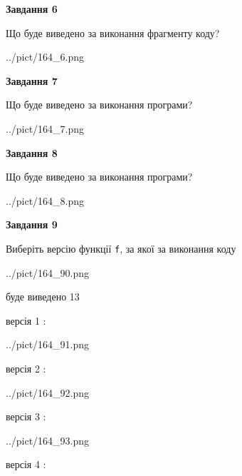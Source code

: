 \documentclass[12pt, ukrainian]{article}
\def\code#1{\Verb!#1!}
\begin{document}
{\begin {large}
{\begin {center}\textbf{Завдання 6}\end {center}}

Що буде виведено за виконання фрагменту коду?\par
\begin{center}
	{../pict/164_6.png}
\end{center}
\newpage

{\begin {center}\textbf{Завдання 7}\end {center}}

Що буде виведено за виконання програми?\par
\begin{center}
	{../pict/164_7.png}
\end{center}
\newpage

{\begin {center}\textbf{Завдання 8}\end {center}}

Що буде виведено за виконання програми?\par
\begin{center}
	{../pict/164_8.png}
\end{center}
\newpage

{\begin {center}\textbf{Завдання 9}\end {center}}

Виберіть версію функції \code{f}, за якої за виконання коду
\begin{center}
	{../pict/164_90.png}
\end{center}
буде виведено 13

\vspace{5mm}
версія 1 :

\begin{center}
	{../pict/164_91.png}
\end{center}
версія 2 :

\begin{center}
	{../pict/164_92.png}
\end{center}
версія 3 :

\begin{center}
	{../pict/164_93.png}
\end{center}
версія 4 :


\end{large}}
\end{document}
